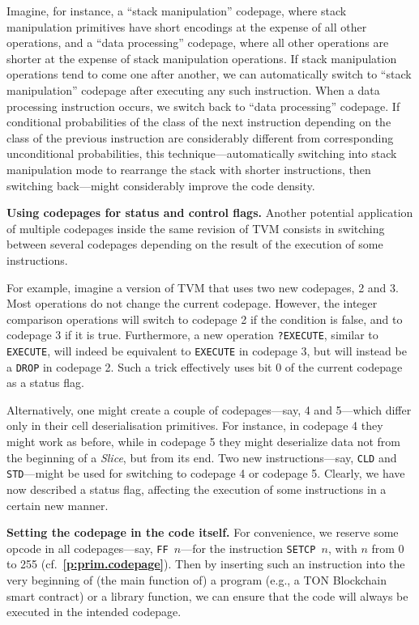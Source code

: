 \documentclass[12pt,oneside]{article}
\def\makepoint#1{\medbreak\noindent{\bf #1.\ }}
\def\nxsubpoint{\refstepcounter{subsubsection}%
  \smallbreak\makepoint{\thesubsubsection}}
\def\refpoint#1{{\rm\textbf{\ref{#1}}}}
\let\ptref=\refpoint
\def\emb#1{\textbf{#1.}}
\begin{document}
Imagine, for instance, a ``stack manipulation'' codepage, where stack manipulation primitives have short encodings at the expense of all other operations, and a ``data processing'' codepage, where all other operations are shorter at the expense of stack manipulation operations. If stack manipulation operations tend to come one after another, we can automatically switch to ``stack manipulation'' codepage after executing any such instruction. When a data processing instruction occurs, we switch back to ``data processing'' codepage. If conditional probabilities of the class of the next instruction depending on the class of the previous instruction are considerably different from corresponding unconditional probabilities, this technique---automatically switching into stack manipulation mode to rearrange the stack with shorter instructions, then switching back---might considerably improve the code density.

\nxsubpoint\emb{Using codepages for status and control flags}
Another potential application of multiple codepages inside the same revision of TVM consists in switching between several codepages depending on the result of the execution of some instructions.

For example, imagine a version of TVM that uses two new codepages, 2 and 3. Most operations do not change the current codepage. However, the integer comparison operations will switch to codepage 2 if the condition is false, and to codepage 3 if it is true. Furthermore, a new operation {\tt ?EXECUTE}, similar to {\tt EXECUTE}, will indeed be equivalent to {\tt EXECUTE} in codepage 3, but will instead be a {\tt DROP} in codepage 2. Such a trick effectively uses bit 0 of the current codepage as a status flag.

Alternatively, one might create a couple of codepages---say, 4 and 5---which differ only in their cell deserialisation primitives. For instance, in codepage 4 they might work as before, while in codepage 5 they might deserialize data not from the beginning of a {\em Slice}, but from its end. Two new instructions---say, {\tt CLD} and {\tt STD}---might be used for switching to codepage 4 or codepage 5. Clearly, we have now described a status flag, affecting the execution of some instructions in a certain new manner.

\nxsubpoint\emb{Setting the codepage in the code itself}\label{sp:setcp.opc}
For convenience, we reserve some opcode in all codepages---say, {\tt FF $n$}---for the instruction {\tt SETCP $n$}, with $n$ from 0 to 255 (cf.~\ptref{p:prim.codepage}). Then by inserting such an instruction into the very beginning of (the main function of) a program (e.g., a TON Blockchain smart contract) or a library function, we can ensure that the code will always be executed in the intended codepage.
\end{document}
